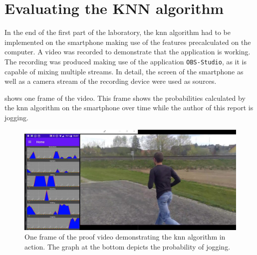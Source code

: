 \section{Evaluating the KNN algorithm}
\label{sec:resultsKNN}
In the end of the first part of the laboratory, the \gls{knn} algorithm had to be implemented on the smartphone making use of the features precalculated on the computer. A video was recorded to demonstrate that the application is working. The recording was produced making use of the application \texttt{OBS-Studio}\autocite{obsproject:website}, as it is capable of mixing multiple streams. In detail, the screen of the smartphone as well as a camera stream of the recording device were used as sources.

 shows one frame of the video. This frame shows the probabilities calculated by the \gls{knn} algorithm on the smartphone over time while the author of this report is jogging.
\begin{figure}[htpb]
\centering
\includegraphics[width=\linewidth]{knn_screenshot}
\caption{One frame of the proof video demonstrating the \gls{knn} algorithm in action. The graph at the bottom depicts the probability of jogging.}
\label{myfig:knn_screenshot}
\end{figure}

